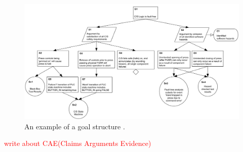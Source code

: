 \begin{figure}
    \includegraphics[width=0.9\linewidth ]{figures/gsn-example.png}
    \centering
    \caption{An example of a goal structure \cite{gsn2004Kelly}.}
    \label{fig:gsn-example}
\end{figure}
\textcolor{red}{write about CAE(Claims Arguments Evidence)}
